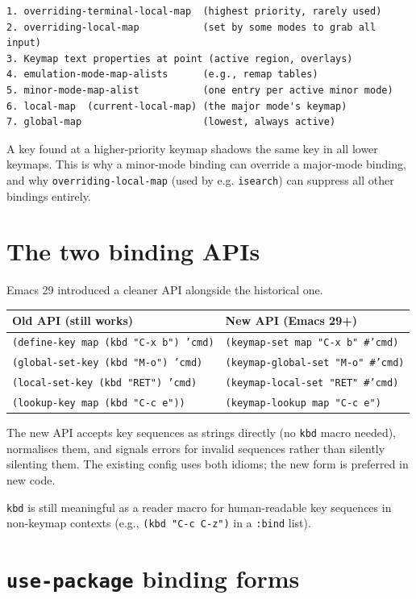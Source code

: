 \begin{verbatim}
1. overriding-terminal-local-map  (highest priority, rarely used)
2. overriding-local-map           (set by some modes to grab all input)
3. Keymap text properties at point (active region, overlays)
4. emulation-mode-map-alists      (e.g., remap tables)
5. minor-mode-map-alist           (one entry per active minor mode)
6. local-map  (current-local-map) (the major mode's keymap)
7. global-map                     (lowest, always active)
\end{verbatim}

A key found at a higher-priority keymap shadows the same key in all lower keymaps. This is why a minor-mode binding can override a major-mode binding, and why \texttt{overriding-local-map} (used by e.g. \texttt{isearch}) can suppress all other bindings entirely.

\section{The two binding APIs}\label{the-two-binding-apis}

Emacs 29 introduced a cleaner API alongside the historical one.

\begin{longtable}[]{@{}ll@{}}
\toprule
Old API (still works) & New API (Emacs 29+) \\
\midrule
\texttt{(define-key map (kbd "C-x b") 'cmd)} & \texttt{(keymap-set map "C-x b" \#'cmd)} \\
\texttt{(global-set-key (kbd "M-o") 'cmd)} & \texttt{(keymap-global-set "M-o" \#'cmd)} \\
\texttt{(local-set-key (kbd "RET") 'cmd)} & \texttt{(keymap-local-set "RET" \#'cmd)} \\
\texttt{(lookup-key map (kbd "C-c e"))} & \texttt{(keymap-lookup map "C-c e")} \\
\bottomrule
\end{longtable}

The new API accepts key sequences as strings directly (no \texttt{kbd} macro needed), normalises them, and signals errors for invalid sequences rather than silently silenting them. The existing config uses both idioms; the new form is preferred in new code.

\texttt{kbd} is still meaningful as a reader macro for human-readable key sequences in non-keymap contexts (e.g., \texttt{(kbd "C-c C-z")} in a \texttt{:bind} list).

\section{\texttt{use-package} binding forms}\label{use-package-binding-forms}


